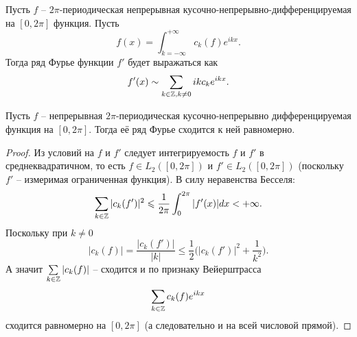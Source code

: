 \begin{corollary}
    Пусть $f$ -- $2\pi$-периодическая непрерывная кусочно-непрерывно-дифференцируемая на $[0, 2\pi]$ функция.
    Пусть
    \[
        f(x) = \int_{k = - \infty}^{+\infty} c_k(f) e^{ikx}.
    \]
    Тогда ряд Фурье функции $f'$ будет выражаться как
    \[
        f'(x) \sim \sum\limits_{k \in \mathbb{Z}, k \neq 0} ik c_k e^{ikx}.
    \]
\end{corollary}
\begin{theorem}
    Пусть $f$ -- непрерывная $2\pi$-периодическая кусочно-непрерывно дифференцируемая функция на $[0, 2\pi]$.
    Тогда её ряд Фурье сходится к ней равномерно.
\end{theorem}
\begin{proof}
    Из условий на $f$ и $f'$ следует интегрируемость $f$ и $f'$ в среднеквадратичном, то есть $f \in L_2([0, 2\pi])$ и $f' \in L_2([0, 2\pi])$ (поскольку $f'$ -- измеримая ограниченная функция).
    В силу неравенства Бесселя:
    \[
        \sum\limits_{k \in \mathbb{Z}} |c_k(f')|^2 \leqslant \frac{1}{2\pi} \int_0^{2\pi} |f'(x)|dx < +\infty.
    \]
    Поскольку при $k \neq 0$
    \[
        |c_k(f)| = \dfrac{|c_k(f')|}{|k|} \leq \frac{1}{2}\biggr(|c_k(f')|^2 + \frac{1}{k^2}\biggr).
    \]
    А значит $\sum\limits_{k \in \mathbb{Z}} |c_k(f)|$ -- сходится и по признаку Вейерштрасса
    \[
        \sum\limits_{k \in \mathbb{Z}} c_k(f)e^{ikx}
    \]
    сходится равномерно на $[0, 2\pi]$ (а следовательно и на всей числовой прямой).
\end{proof}

